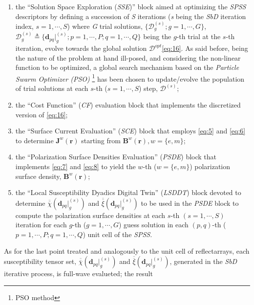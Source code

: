\begin{enumerate}
\item the {}``Solution Space Exploration (\emph{SSE})'' block aimed at
optimizing the \emph{SPSS} descriptors by defining a succession of
\emph{S} iterations (\emph{s} being the \emph{SbD} iteration index,
$s=1,\cdots,S$) where \emph{G} trial solutions, $\{\mathcal{D}_{g}^{(s)};g=1,\cdots,G\}$,$\mathcal{D}_{g}^{(s)}\triangleq\{\mathbf{d}_{pq}|_{g}^{(s)};p=1,\cdots,P;q=1,\cdots,Q\}$
being the $g$-th trial at the $s$-th iteration, evolve towards the
global solution $\mathcal{D}^{opt}$\ref{eq:16}. As said before,
being the nature of the problem at hand ill-posed, and considering
the non-linear function to be optimized, a global search mechanism
based on the \emph{Particle Swarm Optimizer (PSO)}%
\footnote{PSO method%
}{\let\thefootnote\relax{}}
has been chosen to update/evolve the population of trial solutions
at each $s$-th ($s=1,\cdots,S$) step, $\mathcal{D}^{(s)}$;
\item the {}``Cost Function'' (\emph{CF}) evaluation block that implements
the discretized version of \ref{eq:16};
\item the {}``Surface Current Evaluation'' (\emph{SCE}) block that employs
\ref{eq:5} and \ref{eq:6} to determine $\mathbf{J}^{w}(\mathbf{r})$
starting from $\mathbf{B}^{w}(\mathbf{r}),w=\{ e,m\}$;
\item the {}``Polarization Surface Densities Evaluation'' (\emph{PSDE})
block that implements \ref{eq:7} and \ref{eq:8} to yield the $w$-th
($w=\{ e,m\}$) polarization surface density, $\mathbf{B}^{w}(\mathbf{r})$;
\item the {}``Local Susceptibility Dyadics Digital Twin'' (\emph{LSDDT})
block devoted to determine $\overline{\overline{\chi}}(\mathbf{d}_{pq}|_{g}^{(s)})$
and $\overline{\overline{\xi}}(\mathbf{d}_{pq}|_{g}^{(s)})$ to be
used in the \emph{PSDE} block to compute the polarization surface
densities at each $s$-th $(s=1,\cdots,S)$ iteration for each $g$-th
($g=1,\cdots,G$) guess solution in each $(p,q)$-th ($p=1,\cdots,P;q=1,\cdots,Q$)
unit cell of the \emph{SPSS. }
\end{enumerate}
As for the last point treated and analogously to the unit cell of
reflectarrays, each susceptibility tensor set, $\overline{\overline{\chi}}(\mathbf{d}_{pq}|_{g}^{(s)})$
and $\overline{\overline{\xi}}(\mathbf{d}_{pq}|_{g}^{(s)})$, generated
in the \emph{SbD} iterative process, is full-wave evalueted; the result
